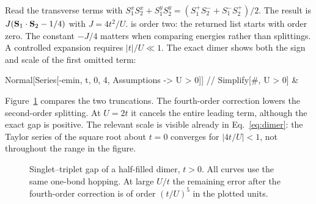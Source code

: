 Read the transverse terms with
$S_1^xS_2^x+S_1^yS_2^y=(S_1^+S_2^-+S_1^-S_2^+)/2$.
The result is $J(\mathbf{S}_1\cdot\mathbf{S}_2-1/4)$ with $J=4t^2/U$.
 is order two: the returned list starts with
order zero. The constant $-J/4$ matters when comparing energies
rather than splittings. A controlled expansion requires $|t|/U\ll1$.
The exact dimer shows both the sign and scale of the first omitted term:
\begin{wl}
Normal[Series[-emin, {t, 0, 4}, Assumptions -> U > 0]] //
  Simplify[#, U > 0] &
\end{wl}
Figure~\ref{fig:dimer-exchange} compares the two truncations. The
fourth-order correction lowers the second-order splitting. At $U=2t$
it cancels the entire leading term, although the exact gap is positive.
The relevant scale is visible already in Eq.~\eqref{eq:dimer}: the
Taylor series of the square root about $t=0$ converges for
$|4t/U|<1$, not throughout the range in the figure.

\begin{figure}[htbp]
\centering
{}
\caption{Singlet--triplet gap of a half-filled dimer, $t>0$. All
curves use the same one-bond hopping. At large $U/t$ the remaining
error after the fourth-order correction is of order $(t/U)^5$ in
the plotted units.}\label{fig:dimer-exchange}
\end{figure}

